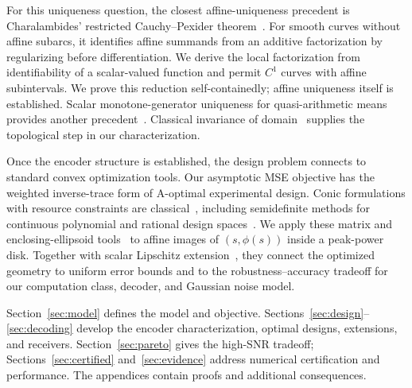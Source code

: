 For this uniqueness question, the closest affine-uniqueness precedent is Charalambides' restricted Cauchy--Pexider theorem~\cite[Theorem 1.6]{charalambides2013}. For smooth curves without affine subarcs, it identifies affine summands from an additive factorization by regularizing before differentiation. We derive the local factorization from identifiability of a scalar-valued function and permit $C^1$ curves with affine subintervals. We prove this reduction self-containedly; affine uniqueness itself is established. Scalar monotone-generator uniqueness for quasi-arithmetic means provides another precedent~\cite[Theorems A and D]{matkowski2015}. Classical invariance of domain~\cite{hatcher} supplies the topological step in our characterization.

Once the encoder structure is established, the design problem connects to standard convex optimization tools. Our asymptotic MSE objective has the weighted inverse-trace form of A-optimal experimental design. Conic formulations with resource constraints are classical~\cite{sagnol2010}, including semidefinite methods for continuous polynomial and rational design spaces~\cite{papp2011}. We apply these matrix and enclosing-ellipsoid tools~\cite{boyd2004} to affine images of $(s,\phi(s))$ inside a peak-power disk. Together with scalar Lipschitz extension~\cite{mcshane1934}, they connect the optimized geometry to uniform error bounds and to the robustness--accuracy tradeoff for our computation class, decoder, and Gaussian noise model.

Section~\ref{sec:model} defines the model and objective. Sections~\ref{sec:design}--\ref{sec:decoding} develop the encoder characterization, optimal designs, extensions, and receivers. Section~\ref{sec:pareto} gives the high-SNR tradeoff; Sections~\ref{sec:certified} and~\ref{sec:evidence} address numerical certification and performance. The appendices contain proofs and additional consequences.
